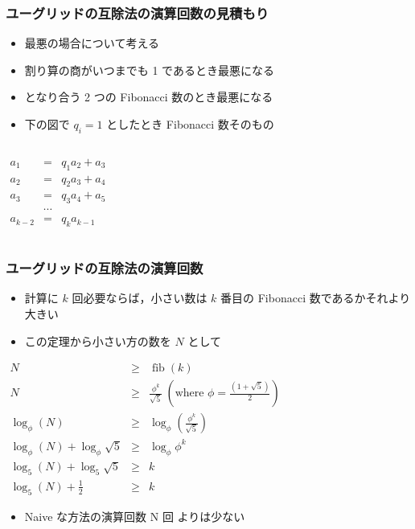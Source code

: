 \begin{frame}[fragile]
\frametitle{ユーグリッドの互除法の演算回数の見積もり}
  \begin{itemize}
\item 最悪の場合について考える
\item 割り算の商がいつまでも 1 であるとき最悪になる
\item となり合う 2 つの Fibonacci 数のとき最悪になる
\item 下の図で $q_i=1$ としたとき Fibonacci 数そのもの
  \end{itemize}
  \begin{columns}[t]
    \begin{column}{0.45\textwidth}
\centering
      \begin{math}
        \begin{array}{rcl}
a_1 &=& q_1 a_2 + a_3\\
a_2 &=& q_2 a_3 + a_4\\
a_3 &=& q_3 a_4 + a_5\\
&\cdots&\\
a_{k-2} &=& q_k a_{k-1}
        \end{array}
      \end{math}
    \end{column}
    \begin{column}{0.45\textwidth}
    \end{column}
  \end{columns}
\end{frame}
\newcommand{\fib}{\mathop{\mathrm{fib}}\nolimits}
\begin{frame}[fragile]
\frametitle{ユーグリッドの互除法の演算回数}
  \begin{itemize}
\item 計算に $k$ 回必要ならば，小さい数は $k$ 番目の Fibonacci 数であるかそれより大きい
\item この定理から小さい方の数を $N$ として
  \end{itemize}
  \begin{center}  
    \begin{math}
      \begin{array}{rcl}
N&\geq& \fib(k)\\
N&\geq& \frac{\phi^{k}}{\sqrt{5}}\ (\mbox{where }\phi=\frac{(1+\sqrt{5})}{2})\\
\log_{\phi}(N)&\geq& \log_{\phi}(\frac{\phi^{k}}{\sqrt{5}})\\
\log_{\phi}(N)+\log_{\phi}\sqrt{5}&\geq& \log_{\phi}\phi^{k}\\
\log_{5}(N)+\log_{5}\sqrt{5}&\geq& k\\
\log_{5}(N)+\frac{1}{2}&\geq& k
      \end{array}
    \end{math}
  \end{center}
  \begin{itemize}
\item Naive な方法の演算回数 N 回 よりは少ない
  \end{itemize}
\end{frame}
